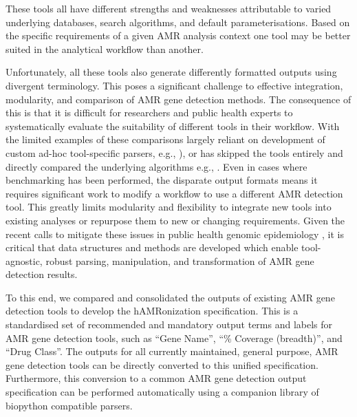 These tools all have different strengths and weaknesses attributable to varied underlying databases, search algorithms, and default parameterisations.  Based on the specific requirements of a given AMR analysis context one tool may be better suited in the analytical workflow than another.    

Unfortunately, all these tools also generate differently formatted outputs using divergent terminology.  This poses a significant challenge to effective integration, modularity, and comparison of AMR gene detection methods.  The consequence of this is that it is difficult for researchers and public health experts to systematically evaluate the suitability of different tools in their workflow. With the limited examples of these comparisons largely reliant on development of custom ad-hoc tool-specific parsers, e.g., \cite{feldgarden_validating_2019, hunt_ariba_2017}), or has skipped the tools entirely and directly compared the underlying algorithms e.g., \cite{mccall_comparative_2018}. Even in cases where benchmarking has been performed, the disparate output formats means it requires significant work to modify a workflow to use a different AMR detection tool. This greatly limits modularity and flexibility to integrate new tools into existing analyses or repurpose them to new or changing requirements. Given the recent calls to mitigate these issues in public health genomic epidemiology \cite{black_ten_2020}, it is critical that data structures and methods are developed which enable tool-agnostic, robust parsing, manipulation, and transformation of AMR gene detection results.

To this end, we compared and consolidated the outputs of existing AMR gene detection tools to develop the hAMRonization specification. This is a standardised set of recommended and mandatory output terms and labels for AMR gene detection tools, such as “Gene Name”, “\% Coverage (breadth)”, and “Drug Class”.  The outputs for all currently maintained, general purpose, AMR gene detection tools can be directly converted to this unified specification.  Furthermore, this conversion to a common AMR gene detection output specification can be performed automatically using a companion library of biopython compatible parsers.

